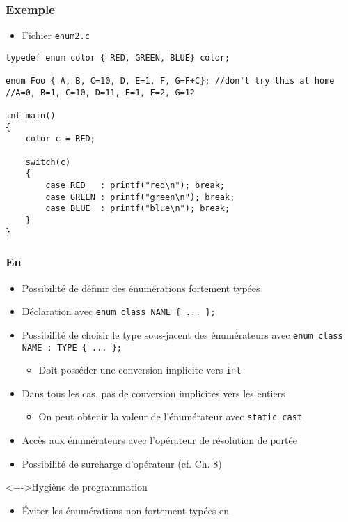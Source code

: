 \begin{frame}[containsverbatim]
\frametitle{Exemple}
\begin{itemize}
\item Fichier \texttt{enum2.c}
\end{itemize}
\begin{lstlisting}
typedef enum color { RED, GREEN, BLUE} color;

enum Foo { A, B, C=10, D, E=1, F, G=F+C}; //don't try this at home
//A=0, B=1, C=10, D=11, E=1, F=2, G=12

int main()
{
    color c = RED;
    
    switch(c) 
    {
        case RED   : printf("red\n"); break;
        case GREEN : printf("green\n"); break;
        case BLUE  : printf("blue\n"); break;
    }
}
\end{lstlisting}
\end{frame}

\begin{frame}
\frametitle{En \cpp}
\begin{itemize}[<+->]
\item Possibilité de définir des énumérations fortement typées
\item Déclaration avec \lstinline|enum class NAME { ... };|
\item Possibilité de choisir le type sous-jacent des énumérateurs avec \lstinline|enum class NAME : TYPE { ... };|
	\begin{itemize}
	\item Doit posséder une conversion implicite vers \lstinline|int|
	\end{itemize}
\item Dans tous les cas, pas de conversion implicites vers les entiers
	\begin{itemize}
	\item On peut obtenir la valeur de l'énumérateur avec \lstinline|static_cast|
	\end{itemize}
\item Accès aux énumérateurs avec l'opérateur de résolution de portée
\item Possibilité de surcharge d'opérateur (cf. Ch. 8)
\end{itemize}
\begin{block}<+->{Hygiène de programmation}
	\begin{itemize}[<+->]
	\item Éviter les énumérations non fortement typées en \cpp
	\end{itemize}
\end{block}
\end{frame}


